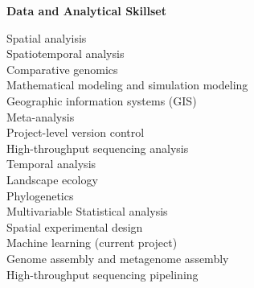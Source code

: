 \documentclass{article}
\begin{document}
{\large  \textbf{Data and Analytical Skillset}}
  \begin{adjustwidth}{2mm}{}\begin{multicols}{2}
    Spatial analyisis \cite{Darcy2018a,Darcy2011a,Darcy640029}\\
    Spatiotemporal analysis \cite{Darcy640029,Darcy2017,Nemergut2016}\\
    Comparative genomics \cite{Darcy2018,Lynch2014}\\
    Mathematical modeling and simulation modeling \cite{Darcy685644,Darcy640029, Darcy2016}\\
    Geographic information systems (GIS) \cite{Darcy640029,Darcy2018a,Darcy2017}\\
    Meta-analysis \cite{Darcy685644,Darcy2018a,Darcy2011a}\\
    Project-level version control \cite[\href{https://github.com/darcyj/specificity}{specificity} R package]{Darcy2018}\\
    High-throughput sequencing analysis \cite{Darcy685644,Darcy640029,Darcy2018a}\\

    Temporal analysis \cite{Darcy685644,Knelman2014,Kennedy2016}\\
    Landscape ecology \cite{Darcy640029,Darcy2018,Darcy2017}\\
    Phylogenetics \cite{Darcy2011a,Schmidt2015a,Naff2013}\\
    Multivariable Statistical analysis \cite{Darcy640029,Darcy2017,Gendron2019}\\
    Spatial experimental design \cite{Darcy2018a,Darcy2017,Darcy2018}\\
    Machine learning (current project)\\
    Genome assembly and metagenome assembly \cite{Darcy2018,Lynch2014}\\
    High-throughput sequencing pipelining \cite{Darcy685644,Darcy640029,Darcy2018a}

  \end{multicols}\end{adjustwidth}
\end{document}
